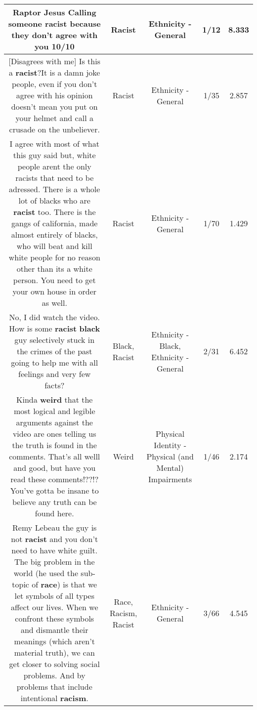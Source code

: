 \documentclass[11pt]{article}
\newlength\mylength
\begin{document}
\begin{center}
\begin{longtable}{|C{.65\mylength}|C{.30\mylength}|C{.12\mylength}|C{.12\mylength}|C{.12\mylength}|}
  \small Raptor Jesus Calling someone \textbf{racist} because they don't agree with you 10/10\normalsize   & Racist & Ethnicity - General & 1/12 & 8.333 \\  \hline
  \small [Disagrees with me] Is this a \textbf{racist}?It is a damn joke people, even if you don't agree with his opinion doesn't mean you put on your helmet and call a crusade on the unbeliever.\normalsize   & Racist & Ethnicity - General & 1/35 & 2.857 \\  \hline
  \small I agree with most of what this guy said but, white people arent the only racists that need to be adressed.  There is a whole lot of blacks who are \textbf{racist} too.  There is the gangs of california, made almost entirely of blacks, who will beat and kill white people for no reason other than its a white person.  You need to get your own house in order as well.\normalsize   & Racist & Ethnicity - General & 1/70 & 1.429 \\  \hline
  \small No, I did watch the video. How is some \textbf{racist} \textbf{black} guy selectively stuck in the crimes of the past going to help me with all feelings and very few facts?\normalsize   & Black, Racist & Ethnicity - Black, Ethnicity - General & 2/31 & 6.452 \\  \hline
  \small Kinda \textbf{weird} that the most logical and legible arguments against the video are ones telling us the truth is found in the comments. That's all welll and good, but have you read these comments!??!? You've gotta be insane to believe any truth can be found here.\normalsize   & Weird & Physical Identity - Physical (and Mental) Impairments & 1/46 & 2.174 \\  \hline
  \small Remy Lebeau the guy is not \textbf{racist} and you don't need to have white guilt. The big problem in the world (he used the sub-topic of \textbf{race}) is that we let symbols of all types affect our lives. When we confront these symbols and dismantle their meanings (which aren't material truth), we can get closer to solving social problems. And by problems that include intentional \textbf{racism}.\normalsize   & Race, Racism, Racist & Ethnicity - General & 3/66 & 4.545 \\  \hline

\end{longtable}
\end{center}
\end{document}
